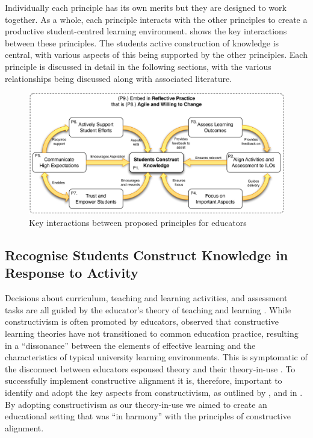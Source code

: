 Individually each principle has its own merits but they are designed to work together. As a whole, each principle interacts with the other principles to create a productive student-centred learning environment.  shows the key interactions between these principles. The students active construction of knowledge is central, with various aspects of this being supported by the other principles. Each principle is discussed in detail in the following sections, with the various relationships being discussed along with associated literature.

\begin{figure}[htbp]
	\centering
	\includegraphics[width=\textwidth]{HowPrinciples}
	\caption{Key interactions between proposed principles for educators}
	\label{fig:how_principles}
\end{figure}


\subsection{Recognise Students Construct Knowledge in Response to Activity} %
\label{ssub:ideas_adopted_from_constructivism}

Decisions about curriculum, teaching and learning activities, and assessment tasks are all guided by the educator's theory of teaching and learning \cite{Argyris:1976,Ramsden:1992}. While constructivism is often promoted by educators, \citet{Phillips:2005} observed that constructive learning theories have not transitioned to common education practice, resulting in a ``dissonance'' between the elements of effective learning and the characteristics of typical university learning environments. This is symptomatic of the disconnect between educators espoused theory and their theory-in-use \cite{Argyris:1976}. To successfully implement constructive alignment it is, therefore, important to identify and adopt the key aspects from constructivism, as outlined by \citet{Biggs:1996c}, \citet{Biggs:1997} and in \citet{Biggs:2007}. By adopting constructivism as our theory-in-use we aimed to create an educational setting that was ``in harmony'' with the principles of constructive alignment.

